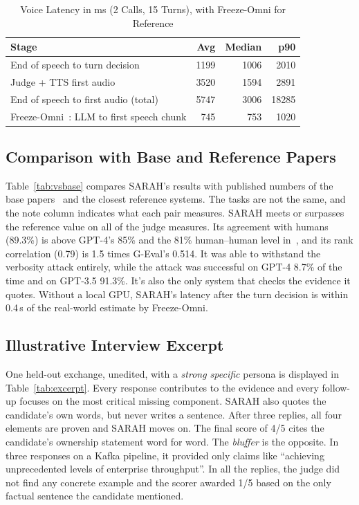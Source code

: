 \documentclass[conference]{IEEEtran}
\begin{document}
\begin{table}[t]
\caption{Voice Latency in ms (2 Calls, 15 Turns), with Freeze-Omni for Reference}
\label{tab:latency}
\centering
\small
\begin{tabularx}{\columnwidth}{@{}X rrr@{}}
\toprule
\textbf{Stage} & \textbf{Avg} & \textbf{Median} & \textbf{p90} \\
\midrule
End of speech to turn decision & 1199 & 1006 & 2010 \\
Judge + TTS first audio & 3520 & 1594 & 2891 \\
End of speech to first audio (total) & 5747 & 3006 & 18285 \\
\midrule
Freeze-Omni~\cite{freezeomni}: LLM to first speech chunk & 745 & 753 & 1020 \\
\bottomrule
\end{tabularx}
\end{table}


\subsection{Comparison with Base and Reference Papers}

Table~\ref{tab:vsbase} compares SARAH's results with published numbers of the base papers~\cite{zheng2023,freezeomni} and the closest reference systems. The tasks are not the same, and the note column indicates what each pair measures. SARAH meets or surpasses the reference value on all of the judge measures. Its agreement with humans (89.3\%) is above GPT-4's 85\% and the 81\% human--human level in~\cite{zheng2023}, and its rank correlation (0.79) is 1.5 times G-Eval's 0.514. It was able to withstand the verbosity attack entirely, while the attack was successful on GPT-4 8.7\% of the time and on GPT-3.5 91.3\%. It's also the only system that checks the evidence it quotes. Without a local GPU, SARAH's latency after the turn decision is within 0.4\,s of the real-world estimate by Freeze-Omni.


\subsection{Illustrative Interview Excerpt}

One held-out exchange, unedited, with a \textit{strong specific} persona is displayed in Table~\ref{tab:excerpt}. Every response contributes to the evidence and every follow-up focuses on the most critical missing component. SARAH also quotes the candidate's own words, but never writes a sentence. After three replies, all four elements are proven and SARAH moves on. The final score of 4/5 cites the candidate's ownership statement word for word. The \textit{bluffer} is the opposite. In three responses on a Kafka pipeline, it provided only claims like ``achieving unprecedented levels of enterprise throughput''. In all the replies, the judge did not find any concrete example and the scorer awarded 1/5 based on the only factual sentence the candidate mentioned.
\end{document}

